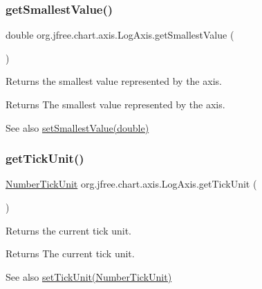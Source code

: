 \subsubsection{\texorpdfstring{get\+Smallest\+Value()}{getSmallestValue()}}
{\footnotesize\ttfamily double org.\+jfree.\+chart.\+axis.\+Log\+Axis.\+get\+Smallest\+Value (\begin{DoxyParamCaption}{ }\end{DoxyParamCaption})}

Returns the smallest value represented by the axis.

\begin{DoxyReturn}{Returns}
The smallest value represented by the axis.
\end{DoxyReturn}
\begin{DoxySeeAlso}{See also}
\mbox{\hyperlink{classorg_1_1jfree_1_1chart_1_1axis_1_1_log_axis_a34f8a540ace9cde63733118ccc9d9b48}{set\+Smallest\+Value(double)}} 
\end{DoxySeeAlso}
\mbox{\label{classorg_1_1jfree_1_1chart_1_1axis_1_1_log_axis_a25a06c24b1103fea5c074518a283fef2}} 
\subsubsection{\texorpdfstring{get\+Tick\+Unit()}{getTickUnit()}}
{\footnotesize\ttfamily \mbox{\hyperlink{classorg_1_1jfree_1_1chart_1_1axis_1_1_number_tick_unit}{Number\+Tick\+Unit}} org.\+jfree.\+chart.\+axis.\+Log\+Axis.\+get\+Tick\+Unit (\begin{DoxyParamCaption}{ }\end{DoxyParamCaption})}

Returns the current tick unit.

\begin{DoxyReturn}{Returns}
The current tick unit.
\end{DoxyReturn}
\begin{DoxySeeAlso}{See also}
\mbox{\hyperlink{classorg_1_1jfree_1_1chart_1_1axis_1_1_log_axis_ac1dd10ceeb8bdc6c1d0631d7fa5f39ad}{set\+Tick\+Unit(\+Number\+Tick\+Unit)}} 
\end{DoxySeeAlso}
\mbox{\label{classorg_1_1jfree_1_1chart_1_1axis_1_1_log_axis_aea09eb0976a44769c91443fd0882a0eb}} 
